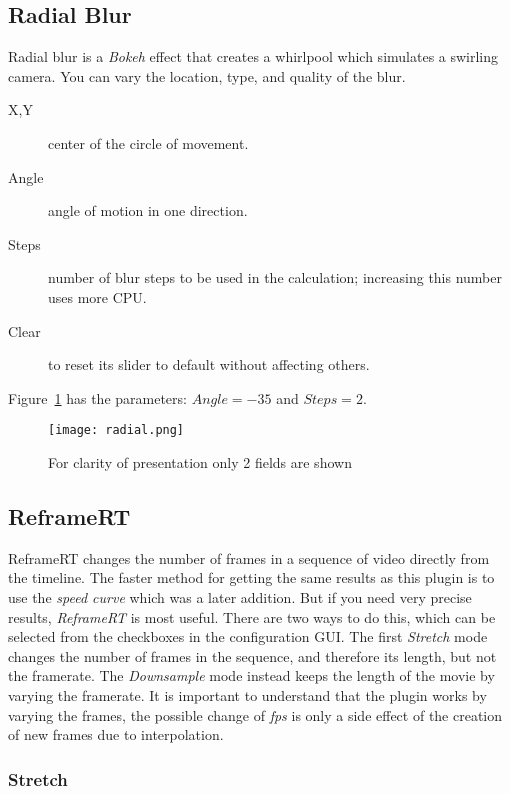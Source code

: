\subsection{Radial Blur}%
\label{sub:radial_blur}

Radial blur is a \textit{Bokeh} effect that creates a whirlpool which simulates a swirling camera. You can vary the location, type, and quality of the blur.

\begin{description}
    \item[X,Y] center of the circle of movement.
    \item[Angle] angle of motion in one direction.
    \item[Steps] number of blur steps to be used in the calculation; increasing this number uses more CPU.
    \item[Clear] to reset its slider to default without affecting others.
\end{description}

Figure~\ref{fig:radial} has the parameters: $Angle=-35$ and $Steps=2$.

\begin{figure}[hbtp]
    \centering
    \texttt{[image: radial.png]}
    \caption{For clarity of presentation only 2 fields are shown}
    \label{fig:radial}
\end{figure}

\subsection{ReframeRT}%
\label{sub:reframert}

ReframeRT changes the number of frames in a sequence of video
directly from the timeline. The faster method for getting the same
results as this plugin is to use the \textit{speed curve} which was
a later addition. But if you need very precise results,
\textit{ReframeRT} is most useful. There are two ways to do this,
which can be selected from the checkboxes in the configuration
GUI\@. The first \textit{Stretch} mode changes the number of frames in
the sequence, and therefore its length, but not the framerate. The
\textit{Downsample} mode instead keeps the length of the movie by
varying the framerate.  It is important to understand that the
plugin works by varying the frames, the possible change of
\textit{fps} is only a side effect of the creation of new frames due
to interpolation.

\subsubsection*{Stretch}%
\label{ssub:stretch}

